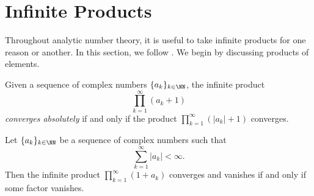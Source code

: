 \documentclass[notes.tex]{subfiles}
\begin{document}
\section{Infinite Products}
Throughout analytic number theory, it is useful to take infinite products for one reason or another. In this section, we follow \cite[Section~5.3]{stein-complex-analysis}. We begin by discussing products of elements.
\begin{definition}
	Given a sequence of complex numbers $\{a_k\}_{k\in\NN}$, the infinite product
	\[\prod_{k=1}^\infty(a_k+1)\]
	\textit{converges absolutely} if and only if the product $\prod_{k=1}^\infty(|a_k|+1)$ converges.
\end{definition}
\begin{lemma} \label{lem:pointwise-inf-prods}
	Let $\{a_k\}_{k\in\NN}$ be a sequence of complex numbers such that
	\[\sum_{k=1}^\infty|a_k|<\infty.\]
	Then the infinite product $\prod_{k=1}^\infty(1+a_k)$ converges and vanishes if and only if some factor vanishes.
\end{lemma}
\end{document}
